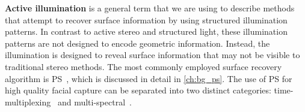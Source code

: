 \textbf{Active illumination} is a general term that we are using to describe
methods that attempt to recover surface information by using structured
illumination patterns. In contrast to active stereo and structured
light, these illumination patterns are not designed to encode geometric
information. Instead, the illumination is designed to reveal surface information
that may not be visible to traditional stereo methods.
The most commonly employed surface recovery
algorithm is PS~\cite{woodham1980photometric}, which is discussed in detail in
\cref{ch:bg_ps}. The use of PS for high quality facial capture
can be separated into two distinct categories: time-multiplexing~\cite{ma2007rapid,%
fyffe2011comprehensive,alexander2009digital,vonderPahlen:2014kg,%
malzbender2006surface,wilson2010temporal,ghosh2011multiview} and
multi-spectral~\cite{vogiatzis2012self,brostow2011video,fyffe2011single}.

